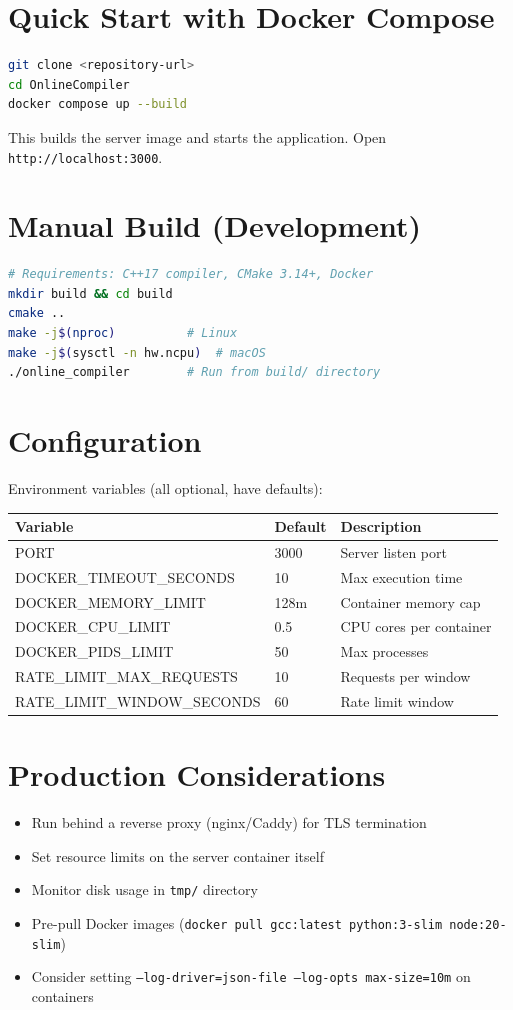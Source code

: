 \documentclass[12pt,a4paper]{report}
\begin{document}
\section{Quick Start with Docker Compose}
\begin{lstlisting}[language=bash]
git clone <repository-url>
cd OnlineCompiler
docker compose up --build
\end{lstlisting}
This builds the server image and starts the application. Open \texttt{http://localhost:3000}.

\section{Manual Build (Development)}
\begin{lstlisting}[language=bash]
# Requirements: C++17 compiler, CMake 3.14+, Docker
mkdir build && cd build
cmake ..
make -j$(nproc)          # Linux
make -j$(sysctl -n hw.ncpu)  # macOS
./online_compiler        # Run from build/ directory
\end{lstlisting}

\section{Configuration}
Environment variables (all optional, have defaults):

\begin{longtable}{@{}p{4.5cm}p{2cm}p{7cm}@{}}
\toprule
\textbf{Variable} & \textbf{Default} & \textbf{Description} \\
\midrule
PORT & 3000 & Server listen port \\
DOCKER\_TIMEOUT\_SECONDS & 10 & Max execution time \\
DOCKER\_MEMORY\_LIMIT & 128m & Container memory cap \\
DOCKER\_CPU\_LIMIT & 0.5 & CPU cores per container \\
DOCKER\_PIDS\_LIMIT & 50 & Max processes \\
RATE\_LIMIT\_MAX\_REQUESTS & 10 & Requests per window \\
RATE\_LIMIT\_WINDOW\_SECONDS & 60 & Rate limit window \\
\bottomrule
\end{longtable}

\section{Production Considerations}
\begin{itemize}
    \item Run behind a reverse proxy (nginx/Caddy) for TLS termination
    \item Set resource limits on the server container itself
    \item Monitor disk usage in \texttt{tmp/} directory
    \item Pre-pull Docker images (\texttt{docker pull gcc:latest python:3-slim node:20-slim})
    \item Consider setting \texttt{--log-driver=json-file --log-opts max-size=10m} on containers
\end{itemize}
\end{document}
